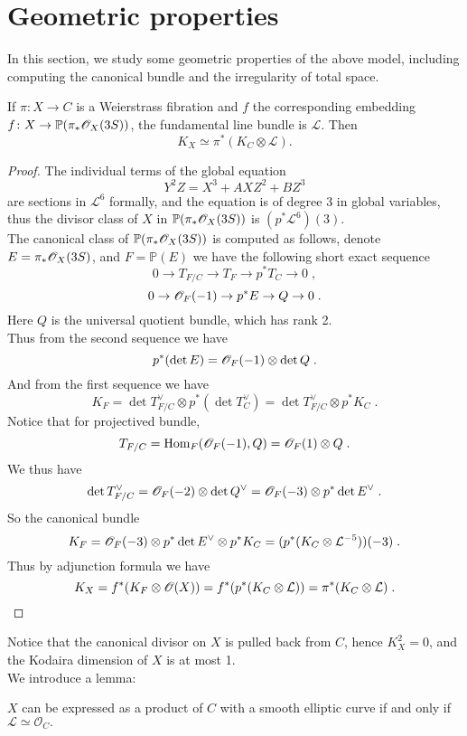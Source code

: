 \section{Geometric properties}
In this section, we study some geometric properties of the above model, including computing the canonical bundle and the irregularity of total space.
\begin{prop}
If $\pi\colon X\rightarrow C$ is a Weierstrass fibration and $f$ the corresponding embedding $f\colon X\rightarrow \mathbb{P}(\pi_*\mathscr{O}_{X}(3S))$, the fundamental line bundle is $\mathcal{L}$. Then
$$K_X\simeq \pi^*(K_C\otimes \mathcal{L}).$$
\end{prop}
\begin{proof}
The individual terms of the global equation 
$$Y^2Z=X^3+AXZ^2+BZ^3$$
are sections in $\mathcal{L}^6$ formally, and the equation is of degree 3 in global variables, thus the divisor class of $X$ in $\mathbb{P}(\pi_*\mathscr{O}_{X}(3S))$ is $(p^*\mathcal{L}^6)(3)$.\\ \indent
The canonical class of $\mathbb{P}(\pi_*\mathscr{O}_{X}(3S))$ is computed as follows, denote $E=\pi_*\mathscr{O}_{X}(3S)$, and $F=\mathbb{P}(E)$ we have the following short exact sequence 
$$0\rightarrow T_{F/C}\rightarrow T_F\rightarrow p^*T_C\rightarrow 0\; ,$$
$$0\rightarrow \mathscr{O}_F(-1)\rightarrow p^*E\rightarrow Q\rightarrow 0\; .$$
Here $Q$ is the universal quotient bundle, which has rank 2.\\ \indent
Thus from the second sequence we have 
$$p^*(\det E)=\mathscr{O}_F(-1) \otimes \det Q\; .$$
And from the first sequence we have
$$K_F=\det T_{F/C}^\vee\otimes p^*(\det T_C^\vee)=\det T_{F/C}^\vee\otimes p^* K_C\; .$$
Notice that for projectived bundle,
$$T_{F/C}=\operatorname{Hom}_F(\mathscr{O}_{F}(-1), Q)=\mathscr{O}_{F}(1) \otimes Q\; .$$
We thus have
$$\det T_{F/C}^\vee=\mathscr{O}_F(-2)\otimes \det Q^\vee=\mathscr{O}_F(-3)\otimes p^*\det E^\vee\; .$$
So the canonical bundle
$$K_F=\mathscr{O}_F(-3)\otimes p^*\det E^\vee\otimes p^*K_C=(p^*(K_C\otimes\mathcal{L}^{-5}))(-3)\; .$$
Thus by adjunction formula we have
$$K_X=f^*(K_F\otimes\mathscr{O}(X))=f^*(p^*(K_C\otimes\mathcal{L}))=\pi^*(K_C\otimes\mathcal{L})\; .$$ 
\end{proof}
Notice that the canonical divisor on $X$ is pulled back from $C$, hence $K_X^2=0$, and the Kodaira dimension of $X$ is at most 1.\\ \indent
We introduce a lemma:
\begin{lemm}
$X$ can be expressed as a product of $C$ with a smooth elliptic curve if and only if $\mathscr{L}\simeq \mathscr{O}_C.$
\end{lemm}
